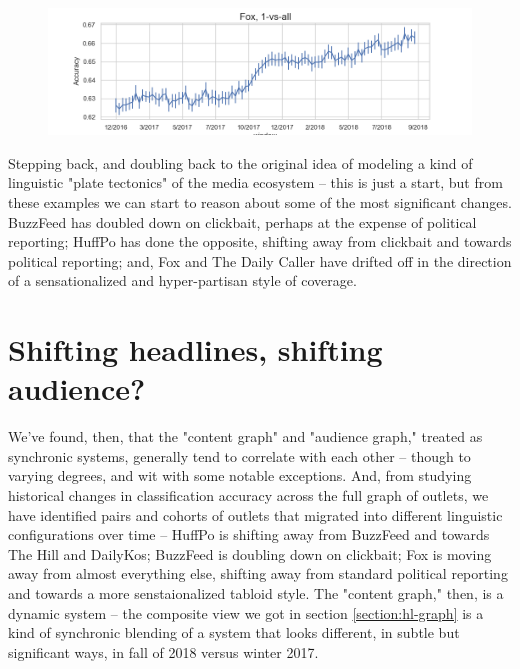 \documentclass{scrartcl}
\begin{document}
\begin{figure}[H]
  \centering
  \includegraphics[width=\textwidth]{figures/ts-ova-fox.png}
\end{figure}

Stepping back, and doubling back to the original idea of modeling a kind of linguistic "plate tectonics" of the media ecosystem -- this is just a start, but from these examples we can start to reason about some of the most significant changes. BuzzFeed has doubled down on clickbait, perhaps at the expense of political reporting; HuffPo has done the opposite, shifting away from clickbait and towards political reporting; and, Fox and The Daily Caller have drifted off in the direction of a sensationalized and hyper-partisan style of coverage.

\section{Shifting headlines, shifting audience?}

We've found, then, that the "content graph" and "audience graph," treated as synchronic systems, generally tend to correlate with each other -- though to varying degrees, and wit with some notable exceptions. And, from studying historical changes in classification accuracy across the full graph of outlets, we have identified pairs and cohorts of outlets that migrated into different linguistic configurations over time -- HuffPo is shifting away from BuzzFeed and towards The Hill and DailyKos; BuzzFeed is doubling down on clickbait; Fox is moving away from almost everything else, shifting away from standard political reporting and towards a more senstaionalized tabloid style. The "content graph," then, is a dynamic system -- the composite view we got in section \ref{section:hl-graph} is a kind of synchronic blending of a system that looks different, in subtle but significant ways, in fall of 2018 versus winter 2017.
\end{document}
